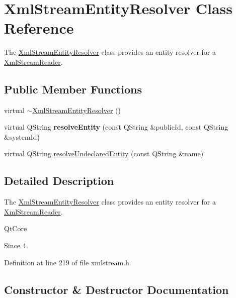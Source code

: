\hypertarget{class_xml_stream_entity_resolver}{}\section{Xml\+Stream\+Entity\+Resolver Class Reference}
\label{class_xml_stream_entity_resolver}


The \hyperlink{class_xml_stream_entity_resolver}{Xml\+Stream\+Entity\+Resolver} class provides an entity resolver for a \hyperlink{class_xml_stream_reader}{Xml\+Stream\+Reader}.  


\subsection*{Public Member Functions}
\begin{DoxyCompactItemize}
\item 
virtual \hyperlink{class_xml_stream_entity_resolver_a35c25460718ff89bc5c26db79f65edf3}{$\sim$\+Xml\+Stream\+Entity\+Resolver} ()
\item 
\mbox{\label{class_xml_stream_entity_resolver_adf94205462c57b2b88ae053aff5e6d1b}} 
virtual Q\+String {\bfseries resolve\+Entity} (const Q\+String \&public\+Id, const Q\+String \&system\+Id)
\item 
virtual Q\+String \hyperlink{class_xml_stream_entity_resolver_adb9a96c9174d809d5f4842fc52829f2c}{resolve\+Undeclared\+Entity} (const Q\+String \&name)
\end{DoxyCompactItemize}


\subsection{Detailed Description}
The \hyperlink{class_xml_stream_entity_resolver}{Xml\+Stream\+Entity\+Resolver} class provides an entity resolver for a \hyperlink{class_xml_stream_reader}{Xml\+Stream\+Reader}. 

Qt\+Core  \begin{DoxySince}{Since}
4. 
\end{DoxySince}


Definition at line 219 of file xmlstream.\+h.



\subsection{Constructor \& Destructor Documentation}
\mbox{\label{class_xml_stream_entity_resolver_a35c25460718ff89bc5c26db79f65edf3}} 
